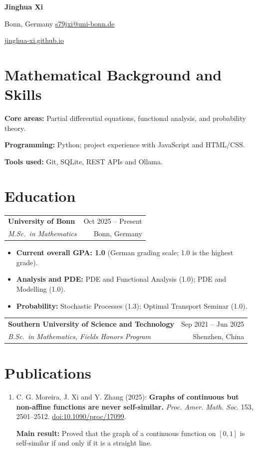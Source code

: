 \documentclass[a4paper,11pt]{article}
\makeatletter
\newcommand{\cventry}[4]{\par\addvspace{3pt}\begin{tabularx}{\linewidth}{@{}>{\raggedright\arraybackslash}X@{\hspace{1em}}r@{}}\textbf{#1} & #2 \\ \textit{#3} & #4\end{tabularx}\par}
\makeatother
\begin{document}
\fontsize{9.5}{11.2}\selectfont
{\fontsize{28}{32}\selectfont\textbf{Jinghua Xi}}\par\vspace{5pt}
Bonn, Germany \enspace\textbar\enspace \href{mailto:s79jxi@uni-bonn.de}{s79jxi@uni-bonn.de}\par
\href{https://jinghua-xi.github.io/}{jinghua-xi.github.io}
\section{Mathematical Background and Skills}
\textbf{Core areas:} Partial differential equations, functional analysis, and probability theory.\par
\textbf{Programming:} Python; project experience with JavaScript and HTML/CSS.\par
\textbf{Tools used:} Git, SQLite, REST APIs and Ollama.
\section{Education}
\cventry{University of Bonn}{Oct 2025 -- Present}{M.Sc.\ in Mathematics}{Bonn, Germany}
\begin{itemize}
\item \textbf{Current overall GPA: 1.0} (German grading scale; 1.0 is the highest grade).
\item \textbf{Analysis and PDE:} PDE and Functional Analysis (1.0); PDE and Modelling (1.0).
\item \textbf{Probability:} Stochastic Processes (1.3); Optimal Transport Seminar (1.0).
\end{itemize}
\cventry{Southern University of Science and Technology}{Sep 2021 -- Jun 2025}{B.Sc.\ in Mathematics, Fields Honors Program}{Shenzhen, China}
\section{Publications}
\begin{enumerate}
\item C. G. Moreira, J. Xi and Y. Zhang (2025): \textbf{Graphs of continuous but non-affine functions are never self-similar.} \textit{Proc. Amer. Math. Soc.} 153, 2501--2512. \href{https://doi.org/10.1090/proc/17099}{doi:10.1090/proc/17099}.\par\smallskip
\textbf{Main result:} Proved that the graph of a continuous function on $[0,1]$ is self-similar if and only if it is a straight line.
\end{enumerate}
\end{document}
